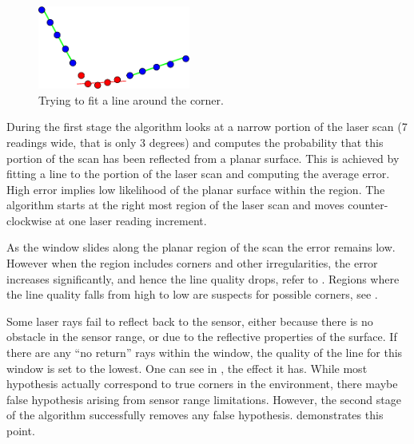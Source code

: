 \begin{figure}[htbp]
  \centering
  \includegraphics[width=5cm]{Pics/fig_corner_example}
  \caption{Trying to fit a line around the corner.}
  \label{fig:corner_example}
\end{figure}

During the first stage the algorithm looks at a narrow portion of the
laser scan (7 readings wide, that is only 3 degrees) and computes the
probability that this portion of the scan has been reflected from a
planar surface. This is achieved by fitting a line to the portion of
the laser scan and computing the average error. High error implies low
likelihood of the planar surface within the region. The algorithm starts
at the right most region of the laser scan and moves counter-clockwise
at one laser reading increment.

As the window slides along the planar region of the scan the error
remains low. However when the region includes corners and other
irregularities, the error increases significantly, and hence the line
quality drops, refer to . Regions where
the line quality falls from high to low are suspects for possible
corners, see .

Some laser rays fail to reflect back to the sensor, either because
there is no obstacle in the sensor range, or due to the reflective
properties of the surface. If there are any ``no return'' rays within
the window, the quality of the line for this window is set to the
lowest. One can see in , the
effect it has. While most hypothesis actually correspond to true
corners in the environment, there maybe false hypothesis arising from
sensor range limitations. However, the second stage of the algorithm
successfully removes any false hypothesis.
 demonstrates this point.

